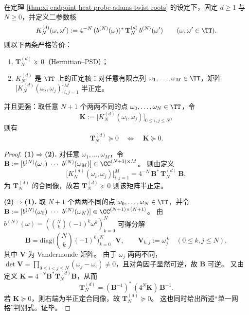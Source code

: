 \begin{theorem}\label{thm:xi-adams-binomial-probe-kernel-toeplitz-psd-equivalence}
在定理 \ref{thm:xi-endpoint-heat-probe-adams-twist-roots} 的设定下，固定 \(d\ge 1\) 与 \(N\ge 0\)，并定义二参数核
\[
K_N^{(d)}(\omega,\omega')
:=4^{-N}\,(b^{(N)}(\omega))^\ast\,\mathbf{T}^{(d)}_N\,b^{(N)}(\omega')
\qquad(\omega,\omega'\in\TT).
\]
则以下两条严格等价：
\begin{enumerate}
  \item \(\mathbf{T}^{(d)}_N\succeq 0\)（Hermitian--PSD）；
  \item \(K_N^{(d)}\) 是 \(\TT\) 上的正定核：对任意有限点列 \(\omega_1,\dots,\omega_M\in\TT\)，矩阵
  \(
  \bigl[K_N^{(d)}(\omega_i,\omega_j)\bigr]_{i,j=1}^{M}
  \)
  半正定。
\end{enumerate}
并且更强：取任意 \(N+1\) 个两两不同的点 \(\omega_0,\dots,\omega_N\in\TT\)，令
\[
\mathbf K:=\bigl[K_N^{(d)}(\omega_i,\omega_j)\bigr]_{0\le i,j\le N},
\]
则有
\[
\boxed{\;
\mathbf{T}^{(d)}_N\succeq 0\quad\Longleftrightarrow\quad \mathbf K\succeq 0.\;}
\]
\end{theorem}
\begin{proof}
\textbf{(1)\(\Rightarrow\)(2).}
对任意 \(\omega_1,\dots,\omega_M\)，令 \(\mathbf B:=[b^{(N)}(\omega_1)\ \cdots\ b^{(N)}(\omega_M)]\in\CC^{(N+1)\times M}\)。
则由定义
\[
\bigl[K_N^{(d)}(\omega_i,\omega_j)\bigr]_{i,j=1}^{M}
=4^{-N}\,\mathbf B^\ast\,\mathbf{T}^{(d)}_N\,\mathbf B,
\]
为 \(\mathbf{T}^{(d)}_N\) 的合同像，故若 \(\mathbf{T}^{(d)}_N\succeq 0\) 则该矩阵半正定。
\par
\textbf{(2)\(\Rightarrow\)(1).}
取 \(N+1\) 个两两不同的点 \(\omega_0,\dots,\omega_N\in\TT\)，并令 \(\mathbf B:=[b^{(N)}(\omega_0)\ \cdots\ b^{(N)}(\omega_N)]\in\CC^{(N+1)\times(N+1)}\)。
由
\(
b^{(N)}(\omega)=(\binom Nk(-1)^k\omega^k)_{k=0}^{N}
\)
可得分解
\[
\mathbf B
=\mathrm{diag}\bigl(\binom Nk(-1)^k\bigr)_{k=0}^{N}\cdot \mathbf V,
\qquad
\mathbf V_{k,j}:=\omega_j^{\,k}\quad(0\le k,j\le N),
\]
其中 \(\mathbf V\) 为 Vandermonde 矩阵。
由于 \(\omega_j\) 两两不同，\(\det\mathbf V=\prod_{0\le i<j\le N}(\omega_j-\omega_i)\neq 0\)，且对角因子显然可逆，故 \(\mathbf B\) 可逆。
又由定义 \(\mathbf K=4^{-N}\mathbf B^\ast\mathbf{T}^{(d)}_N\mathbf B\)，从而
\[
\mathbf{T}^{(d)}_N=(\mathbf B^{-1})^\ast\,(4^N\mathbf K)\,\mathbf B^{-1}.
\]
若 \(\mathbf K\succeq 0\)，则右端为半正定合同像，故 \(\mathbf{T}^{(d)}_N\succeq 0\)。
这也同时给出所述“单一网格”判别式。证毕。
\end{proof}


